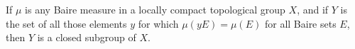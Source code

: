 If $\mu$ is any Baire measure in a locally compact topological group $X$, and if $Y$ is the set of all those elements $y$ for which $\mu(yE) = \mu(E)$ for all Baire sets $E$, then $Y$ is a closed subgroup of $X$.
